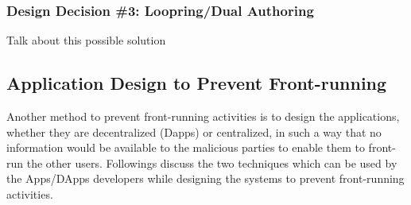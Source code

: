 \subsubsection{Design Decision \#3: Loopring/Dual Authoring\newline}
Talk about this possible solution



\subsection{Application Design to Prevent Front-running}

Another method to prevent front-running activities is to design the applications, whether they are decentralized (Dapps) or centralized, in such a way that no information would be available to the malicious parties to enable them to front-run the other users.
Followings discuss the two techniques which can be used by the Apps/DApps developers while designing the systems to prevent front-running activities.


